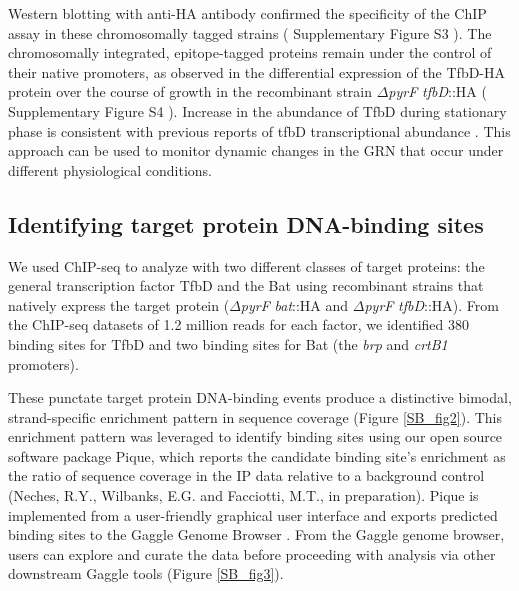 Western blotting with anti-HA antibody confirmed the specificity of the ChIP assay in these chromosomally tagged strains ( Supplementary Figure S3 ). The chromosomally integrated, epitope-tagged proteins remain under the control of their native promoters, as observed in the differential expression of the TfbD-HA protein over the course of growth in the recombinant strain $\Delta${\em pyrF} {\em tfbD}::HA ( Supplementary Figure S4 ). Increase in the abundance of TfbD during stationary phase is consistent with previous reports of tfbD transcriptional abundance \cite{facciotti2010large}. This approach can be used to monitor dynamic changes in the GRN that occur under different physiological conditions.

\subsection{Identifying target protein DNA-binding sites}

We used ChIP-seq to analyze with two different classes of target proteins: the general transcription factor TfbD and the Bat using recombinant strains that natively express the target protein ($\Delta${\em pyrF} {\em bat}::HA and $\Delta${\em pyrF} {\em tfbD}::HA). From the ChIP-seq datasets of 1.2 million reads for each factor, we identified 380 binding sites for TfbD and two binding sites for Bat (the {\em brp} and {\em crtB1} promoters).

These punctate target protein DNA-binding events produce a distinctive bimodal, strand-specific enrichment pattern in sequence coverage (Figure \ref{SB_fig2}). This enrichment pattern was leveraged to identify binding sites using our open source software package Pique, which reports the candidate binding site’s enrichment as the ratio of sequence coverage in the IP data relative to a background control (Neches, R.Y., Wilbanks, E.G. and Facciotti, M.T., in preparation). Pique is implemented from a user-friendly graphical user interface and exports predicted binding sites to the Gaggle Genome Browser \cite{bare_integration_2010}. From the Gaggle genome browser, users can explore and curate the data before proceeding with analysis via other downstream Gaggle tools (Figure \ref{SB_fig3}).

